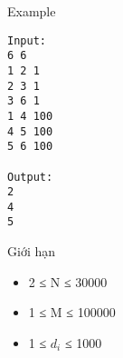 Example  
\begin{verbatim}
Input:
6 6
1 2 1
2 3 1
3 6 1
1 4 100
4 5 100
5 6 100

Output:
2
4 
5

\end{verbatim}
   Giới hạn  
\begin{itemize}
	\item     2 ≤ N ≤ 30000   
	\item     1 ≤ M ≤ 100000   
	\item     1 ≤ $d_{i}$    ≤ 1000   
\end{itemize}